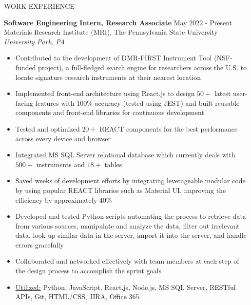 \documentclass{resume} %
\begin{document}
\begin{rSection}{WORK EXPERIENCE}

\textbf{Software Engineering Intern, Research Associate} \hfill May $2022$ - Present\\
Materials Research Institute (MRI), The Pennsylvania State University \hfill \textit{University Park, PA}
 \begin{itemize}
    \itemsep -3pt {}
     \item Contributed to the development of DMR-FIRST Instrument Tool (NSF-funded project), a full-fledged search engine for researchers across the U.S. to locate signature research instruments at their nearest location
     \item Implemented front-end architecture using React.js to design $50+$ latest user-facing features with $100\%$ accuracy (tested using JEST) and built reusable components and front-end libraries for continuous development
     \item Tested and optimized $20+$ REACT components for the best performance across every device and browser
     \item Integrated MS SQL Server relational database which currently deals with $500+$ instruments and $18+$ tables
     \item Saved weeks of development efforts by integrating leverageable modular code by using popular REACT libraries such as Material UI, improving the efficiency by approximately $40\%$
     \item Developed and tested Python scripts automating the process to retrieve data from various sources, manipulate and analyze the data, filter out irrelevant data, look up similar data in the server, import it into the server, and handle errors gracefully
     \item Collaborated and networked effectively with team members at each step of the design process to accomplish the sprint goals 
     \item \underline{Utilized:} Python, JavaScript, React.js, Node.js, MS SQL Server, RESTful APIs, Git, HTML/CSS, JIRA, Office 365
    \end{itemize}

\end{rSection} 


\end{document}
